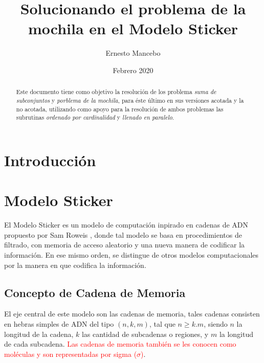 \documentclass[12pt, letterpaper, twoside]{article}
\title{Solucionando el problema de la mochila en el Modelo Sticker}
\author{Ernesto Mancebo}
\date{Febrero 2020}
\begin{document}
    \maketitle
    \begin{abstract}
        Este documento tiene como objetivo la resolución de los problema \emph{suma de subconjuntos} y \emph{porblema de la mochila}, para éste último en sus versiones acotada y la no acotada, utilizando como apoyo para la resolución de ambos problemas las subrutinas \emph{ordenado por cardinalidad} y \emph{llenado en paralelo}.
    \end{abstract}

    \newpage
    \section{Introducción}

    \section{Modelo Sticker}
    El Modelo Sticker es un modelo de computación inpirado en cadenas de ADN propuesto por Sam Roweis \textcolor{red}{\cite{article}}, donde tal modelo se basa en procedimientos de filtrado, con memoria de acceso aleatorio y una nueva manera de codificar la información. En ese mismo orden, se distingue de otros modelos computacionales por la manera en que codifica la información.

    \subsection{Concepto de Cadena de Memoria}
    El eje central de este modelo son las cadenas de memoria, tales cadenas consisten en hebras simples de ADN del tipo $(n, k, m)$, tal que $n\geq k.m$, siendo $n$ la longitud de la cadena, $k$ las cantidad de subcadenas o regiones, y $m$ la longitud de cada subcadena.\textcolor{red}{ Las cadenas de memoria también se les conocen como moléculas y son representadas por sigma ($\sigma$)}. \par
\end{document}
